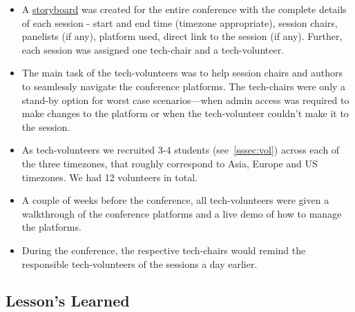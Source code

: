 \documentclass[%
10pt,								%
titlepage,						%
]
{scrartcl}
\begin{document}
\begin{itemize}
    \item A \href{https://docs.google.com/spreadsheets/d/1ENeS3DyxSxWQGRSsiMsHuddwmdlg6r_4tH6VTcvLgMg/edit?usp=sharing}{storyboard} was created for the entire conference with the complete details of each session - start and end time (timezone appropriate), session chairs, panelists (if any), platform used, direct link to the session (if any). Further, each session was assigned one tech-chair and a tech-volunteer. 
    \item The main task of the tech-volunteers was to help session chairs and authors to seamlessly navigate the conference platforms. The tech-chairs were only a stand-by option for worst case scenarios---when admin access was required to make changes to the platform or when the tech-volunteer couldn't make it to the session.
    \item As tech-volunteers we recruited 3-4 students (see~\ref{sssec:vol}) across each of the three timezones, that roughly correspond to Asia, Europe and US timezones. We had 12 volunteers in total.
    \item A couple of weeks before the conference, all tech-volunteers were given a walkthrough of the conference platforms and a live demo of how to manage the platforms.
    \item During the conference, the respective tech-chairs would remind the responsible tech-volunteers of the sessions a day earlier. 
    
    
\end{itemize}



\subsection{Lesson's Learned}
\end{document}
